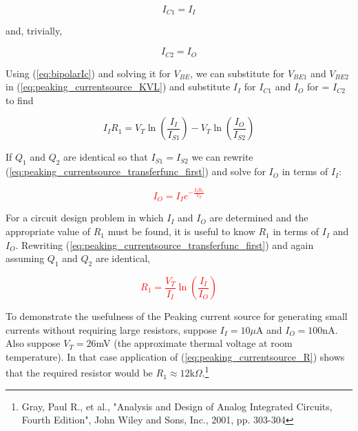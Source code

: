\begin{equation}
I_{C1} = I_{I}
\end{equation}

\noindent and, trivially,

\begin{equation}
I_{C2} = I_{O}
\end{equation}

\noindent Using (\ref{eq:bipolarIc}) and solving it for $V_{BE}$, we can substitute for $V_{BE1}$ and $V_{BE2}$ in (\ref{eq:peaking_currentsource_KVL}) and substitute $I_{I}$ for $I_{C1}$ and $I_{O}$ for = $I_{C2}$ to find

\begin{equation}
I_{I}R_{1} = V_{T}\ln\left(\frac{I_{I}}{I_{S1}}\right) - V_{T}\ln\left(\frac{I_{O}}{I_{S2}}\right)
\label{eq:peaking_currentsource_transferfunc_first}
\end{equation}

\noindent If $Q_{1}$ and $Q_{2}$ are identical so that $I_{S1} = I_{S2}$ we can rewrite (\ref{eq:peaking_currentsource_transferfunc_first}) and solve for $I_{O}$ in terms of $I_{I}$:

\textcolor{red}{
\begin{equation}
I_{O} = I_{I}e^{-\frac{I_{I}R_{1}}{V_{T}}}
\end{equation}
}

For a circuit design problem in which $I_{I}$ and $I_{O}$ are determined and the appropriate value of $R_{1}$ must be found, it is useful to know $R_{1}$ in terms of $I_{I}$ and $I_{O}$. Rewriting (\ref{eq:peaking_currentsource_transferfunc_first}) and again assuming $Q_{1}$ and $Q_{2}$ are identical,

\textcolor{red}{
\begin{equation}
R_{1} = \frac{V_{T}}{I_{I}}\ln\left(\frac{I_{I}}{I_{O}}\right)
\label{eq:peaking_currentsource_R}
\end{equation}
}

To demonstrate the usefulness of the Peaking current source for generating small currents without requiring large resistors, suppose $I_{I} = 10\mu$A and $I_{O} = 100$nA. Also suppose $V_{T} = 26$mV (the approximate thermal voltage at room temperature). In that case application of (\ref{eq:peaking_currentsource_R}) shows that the required resistor would be $R_{1} \approx 12$k$\Omega$.\footnote{Gray, Paul R., et al., "Analysis and Design of Analog Integrated Circuits, Fourth Edition", John Wiley and Sons, Inc., 2001, pp. 303-304}


